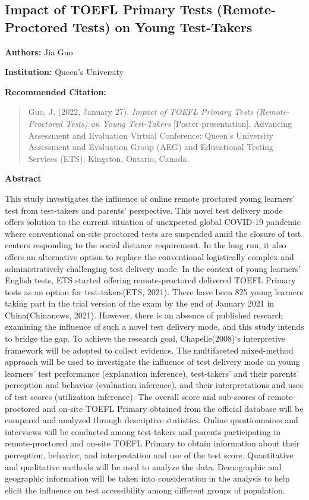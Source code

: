 \documentclass[
]{book}
\begin{document}
\newpage

\hypertarget{impact-of-toefl-primary-tests-remote-proctored-tests-on-young-test-takers}{%
\subsection{Impact of TOEFL Primary Tests (Remote-Proctored Tests) on Young Test-Takers}\label{impact-of-toefl-primary-tests-remote-proctored-tests-on-young-test-takers}}

\textbf{Authors:} Jia Guo

\textbf{Institution:} Queen's University

\textbf{Recommended Citation:}

\begin{quote}
Guo, J. (2022, January 27). \emph{Impact of TOEFL Primary Tests (Remote-Proctored Tests) on Young Test-Takers} {[}Poster presentation{]}. Advancing Assessment and Evaluation Virtual Conference: Queen's University Assessment and Evaluation Group (AEG) and Educational Testing Services (ETS), Kingston, Ontario, Canada.
\end{quote}

\textbf{Abstract}

This study investigates the influence of online remote proctored young learners' test from test-takers and parents' perspective. This novel test delivery mode offers solution to the current situation of unexpected global COVID-19 pandemic where conventional on-site proctored tests are suspended amid the closure of test centers responding to the social distance requirement. In the long run, it also offers an alternative option to replace the conventional logistically complex and administratively challenging test delivery mode. In the context of young learners' English tests, ETS started offering remote-proctored delivered TOEFL Primary tests as an option for test-takers(ETS, 2021). There have been 825 young learners taking part in the trial version of the exam by the end of January 2021 in China(Chinanews, 2021). However, there is an absence of published research examining the influence of such a novel test delivery mode, and this study intends to bridge the gap. To achieve the research goal, Chapelle(2008)`s interpretive framework will be adopted to collect evidence. The multifaceted mixed-method approach will be used to investigate the influence of test delivery mode on young learners' test performance (explanation inference), test-takers' and their parents' perception and behavior (evaluation inference), and their interpretations and uses of test scores (utilization inference). The overall score and sub-scores of remote-proctored and on-site TOEFL Primary obtained from the official database will be compared and analyzed through descriptive statistics. Online questionnaires and interviews will be conducted among test-takers and parents participating in remote-proctored and on-site TOEFL Primary to obtain information about their perception, behavior, and interpretation and use of the test score. Quantitative and qualitative methods will be used to analyze the data. Demographic and geographic information will be taken into consideration in the analysis to help elicit the influence on test accessibility among different groups of population.
\end{document}
